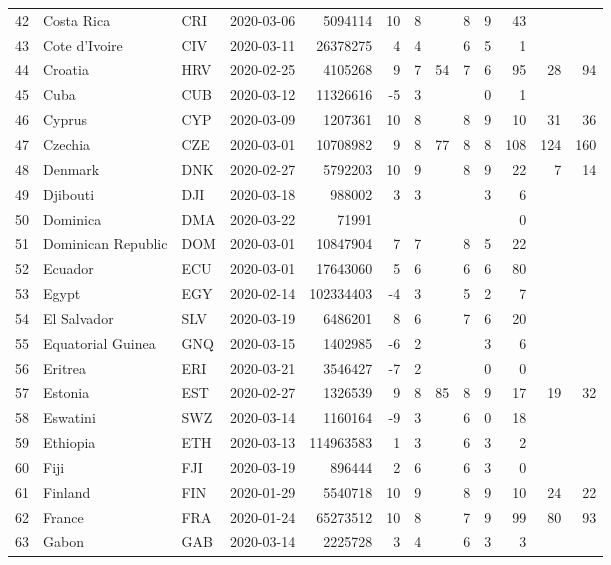 \begin{longtable}{rlllrrrrrrrrr}
  42 & Costa Rica & CRI & 2020-03-06 & 5094114 & 10 & 8 &  & 8 & 9 & 43 &  &  \\ 
  43 & Cote d'Ivoire & CIV & 2020-03-11 & 26378275 & 4 & 4 &  & 6 & 5 & 1 &  &  \\ 
  44 & Croatia & HRV & 2020-02-25 & 4105268 & 9 & 7 & 54 & 7 & 6 & 95 & 28 & 94 \\ 
  45 & Cuba & CUB & 2020-03-12 & 11326616 & -5 & 3 &  &  & 0 & 1 &  &  \\ 
  46 & Cyprus & CYP & 2020-03-09 & 1207361 & 10 & 8 &  & 8 & 9 & 10 & 31 & 36 \\ 
  47 & Czechia & CZE & 2020-03-01 & 10708982 & 9 & 8 & 77 & 8 & 8 & 108 & 124 & 160 \\ 
  48 & Denmark & DNK & 2020-02-27 & 5792203 & 10 & 9 &  & 8 & 9 & 22 & 7 & 14 \\ 
  49 & Djibouti & DJI & 2020-03-18 & 988002 & 3 & 3 &  &  & 3 & 6 &  &  \\ 
  50 & Dominica & DMA & 2020-03-22 & 71991 &  &  &  &  &  & 0 &  &  \\ 
  51 & Dominican Republic & DOM & 2020-03-01 & 10847904 & 7 & 7 &  & 8 & 5 & 22 &  &  \\ 
  52 & Ecuador & ECU & 2020-03-01 & 17643060 & 5 & 6 &  & 6 & 6 & 80 &  &  \\ 
  53 & Egypt & EGY & 2020-02-14 & 102334403 & -4 & 3 &  & 5 & 2 & 7 &  &  \\ 
  54 & El Salvador & SLV & 2020-03-19 & 6486201 & 8 & 6 &  & 7 & 6 & 20 &  &  \\ 
  55 & Equatorial Guinea & GNQ & 2020-03-15 & 1402985 & -6 & 2 &  &  & 3 & 6 &  &  \\ 
  56 & Eritrea & ERI & 2020-03-21 & 3546427 & -7 & 2 &  &  & 0 & 0 &  &  \\ 
  57 & Estonia & EST & 2020-02-27 & 1326539 & 9 & 8 & 85 & 8 & 9 & 17 & 19 & 32 \\ 
  58 & Eswatini & SWZ & 2020-03-14 & 1160164 & -9 & 3 &  & 6 & 0 & 18 &  &  \\ 
  59 & Ethiopia & ETH & 2020-03-13 & 114963583 & 1 & 3 &  & 6 & 3 & 2 &  &  \\ 
  60 & Fiji & FJI & 2020-03-19 & 896444 & 2 & 6 &  & 6 & 3 & 0 &  &  \\ 
  61 & Finland & FIN & 2020-01-29 & 5540718 & 10 & 9 &  & 8 & 9 & 10 & 24 & 22 \\ 
  62 & France & FRA & 2020-01-24 & 65273512 & 10 & 8 &  & 7 & 9 & 99 & 80 & 93 \\ 
  63 & Gabon & GAB & 2020-03-14 & 2225728 & 3 & 4 &  & 6 & 3 & 3 &  &  \\ 

\end{longtable}

